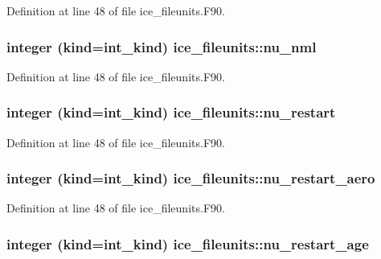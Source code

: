 Definition at line 48 of file ice\_\-fileunits.F90.\hypertarget{namespaceice__fileunits_a1c0f914707e7a61a579be21df178f061}{
\subsubsection[{nu\_\-nml}]{\setlength{\rightskip}{0pt plus 5cm}integer (kind=int\_\-kind) {\bf ice\_\-fileunits::nu\_\-nml}}}
\label{namespaceice__fileunits_a1c0f914707e7a61a579be21df178f061}


Definition at line 48 of file ice\_\-fileunits.F90.\hypertarget{namespaceice__fileunits_ae4a1de3342cf6bce1bd90d7517833d5d}{
\subsubsection[{nu\_\-restart}]{\setlength{\rightskip}{0pt plus 5cm}integer (kind=int\_\-kind) {\bf ice\_\-fileunits::nu\_\-restart}}}
\label{namespaceice__fileunits_ae4a1de3342cf6bce1bd90d7517833d5d}


Definition at line 48 of file ice\_\-fileunits.F90.\hypertarget{namespaceice__fileunits_ada7b0914203fb0183cdf612624f0df75}{
\subsubsection[{nu\_\-restart\_\-aero}]{\setlength{\rightskip}{0pt plus 5cm}integer (kind=int\_\-kind) {\bf ice\_\-fileunits::nu\_\-restart\_\-aero}}}
\label{namespaceice__fileunits_ada7b0914203fb0183cdf612624f0df75}


Definition at line 48 of file ice\_\-fileunits.F90.\hypertarget{namespaceice__fileunits_a89e50699c9cae8e65d7fadbc1f065677}{
\subsubsection[{nu\_\-restart\_\-age}]{\setlength{\rightskip}{0pt plus 5cm}integer (kind=int\_\-kind) {\bf ice\_\-fileunits::nu\_\-restart\_\-age}}}
\label{namespaceice__fileunits_a89e50699c9cae8e65d7fadbc1f065677}


